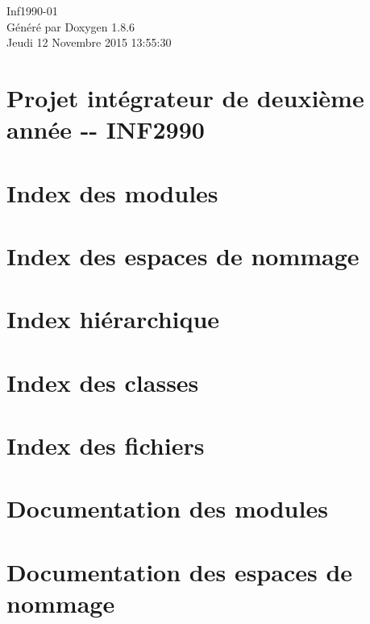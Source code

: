 \documentclass[twoside]{book}
\newcommand{\clearemptydoublepage}{%
  \newpage{\pagestyle{empty}\cleardoublepage}%
}
\begin{document}
\hypersetup{pageanchor=false}
\begin{titlepage}
\vspace*{7cm}
\begin{center}%
{\Large Inf1990-\/01 }\\
\vspace*{1cm}
{\large Généré par Doxygen 1.8.6}\\
\vspace*{0.5cm}
{\small Jeudi 12 Novembre 2015 13:55:30}\\
\end{center}
\end{titlepage}
\clearemptydoublepage
\tableofcontents
\clearemptydoublepage
{}
\hypersetup{pageanchor=true}

\chapter{Projet intégrateur de deuxième année -\/-\/ I\-N\-F2990}
\label{index}\hypertarget{index}{}
\chapter{Index des modules}

\chapter{Index des espaces de nommage}

\chapter{Index hiérarchique}

\chapter{Index des classes}

\chapter{Index des fichiers}

\chapter{Documentation des modules}





\chapter{Documentation des espaces de nommage}






\end{document}
